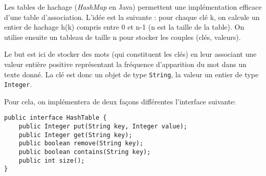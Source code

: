 \documentclass[iutinfo,a4paper,nocorrections,10pt]{ustl-tdtp}
\date{\annee{2017}--\annee{2018}}
\begin{document}
\maketitle
\thispagestyle{empty}

Les tables de hachage (\textit{HashMap} en Java) permettent une implémentation efficace d'une table d'association. L'idée est la suivante : pour chaque clé k, on calcule un entier de hachage h(k) compris entre 0 et n-1 (n est la taille de la table). On utilise ensuite un tableau de taille n pour stocker les couples (clés, valeurs).

Le but est ici de stocker des mots (qui constituent les clés) en leur associant une valeur entière positive représentant la fréquence d'apparition du mot dans un texte donné. La clé est donc un objet de type \texttt{String}, la valeur un entier de type \texttt{Integer}.

Pour cela, on implémentera de deux façons différentes l'interface suivante:


\begin{verbatim}
public interface HashTable {
    public Integer put(String key, Integer value);
    public Integer get(String key);
    public boolean remove(String key);
    public boolean contains(String key);
    public int size();
}
\end{verbatim}

 \\

 \\

\end{document}
